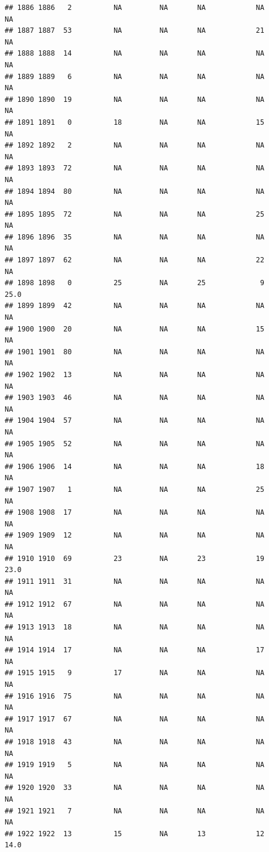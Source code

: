 \documentclass[man]{apa6}
\begin{document}
\begin{verbatim}
## 1886 1886   2          NA         NA       NA            NA       NA
## 1887 1887  53          NA         NA       NA            21       NA
## 1888 1888  14          NA         NA       NA            NA       NA
## 1889 1889   6          NA         NA       NA            NA       NA
## 1890 1890  19          NA         NA       NA            NA       NA
## 1891 1891   0          18         NA       NA            15       NA
## 1892 1892   2          NA         NA       NA            NA       NA
## 1893 1893  72          NA         NA       NA            NA       NA
## 1894 1894  80          NA         NA       NA            NA       NA
## 1895 1895  72          NA         NA       NA            25       NA
## 1896 1896  35          NA         NA       NA            NA       NA
## 1897 1897  62          NA         NA       NA            22       NA
## 1898 1898   0          25         NA       25             9     25.0
## 1899 1899  42          NA         NA       NA            NA       NA
## 1900 1900  20          NA         NA       NA            15       NA
## 1901 1901  80          NA         NA       NA            NA       NA
## 1902 1902  13          NA         NA       NA            NA       NA
## 1903 1903  46          NA         NA       NA            NA       NA
## 1904 1904  57          NA         NA       NA            NA       NA
## 1905 1905  52          NA         NA       NA            NA       NA
## 1906 1906  14          NA         NA       NA            18       NA
## 1907 1907   1          NA         NA       NA            25       NA
## 1908 1908  17          NA         NA       NA            NA       NA
## 1909 1909  12          NA         NA       NA            NA       NA
## 1910 1910  69          23         NA       23            19     23.0
## 1911 1911  31          NA         NA       NA            NA       NA
## 1912 1912  67          NA         NA       NA            NA       NA
## 1913 1913  18          NA         NA       NA            NA       NA
## 1914 1914  17          NA         NA       NA            17       NA
## 1915 1915   9          17         NA       NA            NA       NA
## 1916 1916  75          NA         NA       NA            NA       NA
## 1917 1917  67          NA         NA       NA            NA       NA
## 1918 1918  43          NA         NA       NA            NA       NA
## 1919 1919   5          NA         NA       NA            NA       NA
## 1920 1920  33          NA         NA       NA            NA       NA
## 1921 1921   7          NA         NA       NA            NA       NA
## 1922 1922  13          15         NA       13            12     14.0

\end{verbatim}
\end{document}
